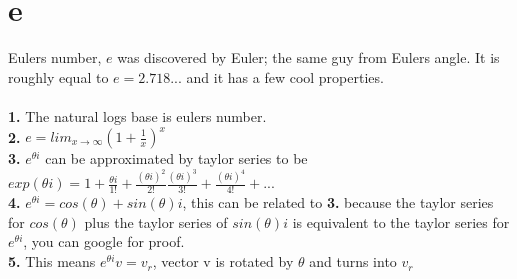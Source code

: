 \documentclass{article}
\begin{document}
\section{e}
Eulers number, $e$ was discovered by Euler; the same guy from Eulers angle. It is roughly equal to $e=2.718 ...$ and it has a few cool properties.\\\\
\textbf{1. } The natural logs base is eulers number. \\
\textbf{2. }$e = lim_{x \xrightarrow{} \infty} (1 + \frac{1}{x})^x$\\
\textbf{3. } $e^{\theta i}$ can be approximated by taylor series to be $exp(\theta i )= 1+\frac{\theta i}{1!}+\frac{(\theta i)^2}{2!}
\frac{(\theta i)^3}{3!}+\frac{(\theta i)^4}{4!}+...$\\
\textbf{4. } $e^{\theta i}=cos(\theta)+sin(\theta)i$, this can be related to \textbf{3.} because the taylor series for $cos(\theta)$ plus the taylor series of $sin(\theta)i$ is equivalent to the taylor series for $e^{\theta i}$, you can google for proof.\\
\textbf{5. } This means $e^{\theta i}v=v_r$, vector v is rotated by $\theta$ and turns into $v_r$
\end{document}
